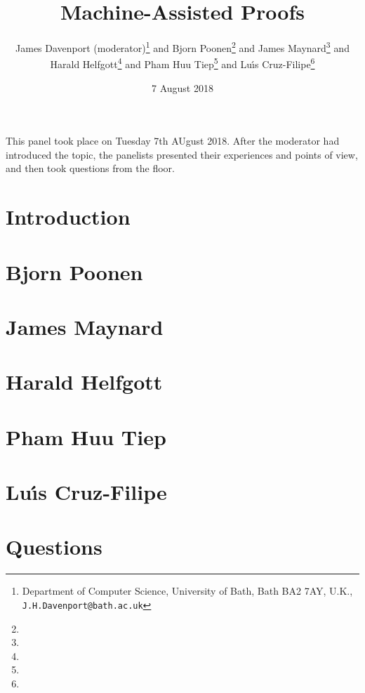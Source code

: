 \documentclass{article}
\begin{document}
\title{Machine-Assisted Proofs}
\author{James Davenport (moderator)\footnote{Department of Computer Science, University of Bath, Bath BA2 7AY, U.K., {\tt J.H.Davenport@bath.ac.uk}}{ } and Bjorn Poonen\footnote{}{ } and James Maynard\footnote{}{ } and \\Harald Helfgott\footnote{}{ } and Pham Huu Tiep\footnote{}{ } and Lu\'\i{}s Cruz-Filipe\footnote{}}
\date{7 August 2018}
\maketitle
This panel took place on Tuesday 7th AUgust 2018. After the moderator had introduced the topic, the panelists presented their experiences and points of view, and then took questions from the floor.
\section{Introduction}

\section{Bjorn Poonen}

\section{James Maynard}

\section{Harald Helfgott}

\section{Pham Huu Tiep}

\section{Lu\'\i{}s Cruz-Filipe}

\section{Questions}


\end{document}
